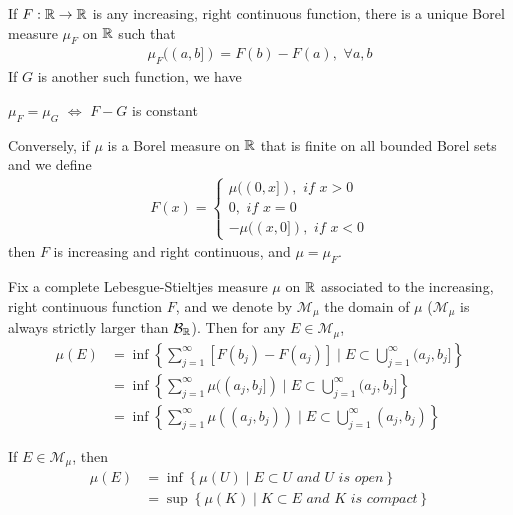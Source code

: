 	\begin{thm}\label{thm 2.5.1}
		If $F : \mathbb{R} \rightarrow \mathbb{R}$ is any increasing, right continuous function, there is a unique Borel measure $\mu_F$ on $\mathbb{R}$ such that 
		\begin{align}
			\mu_F((a , b]) = F(b) - F(a) , \,\, \forall a , b
		\end{align}
		If $G$ is another such function, we have
		\begin{center}
			$\mu_F = \mu_G \,\, \Leftrightarrow \,\, F - G$ is constant
		\end{center}
		Conversely, if $\mu$ is a Borel measure on $\mathbb{R}$ that is finite on all bounded Borel sets and we define
		\begin{align}
			F(x) = 
			\begin{cases}
				\mu((0 , x]) , \,\, if \,\, x > 0 \\
				0 , \,\, if \,\, x = 0 \\
				-\mu((x , 0]) , \,\, if \,\, x < 0
			\end{cases}
		\end{align}
		then $F$ is increasing and right continuous, and $\mu = \mu_F$.
	\end{thm}

	\newpage
	
	\begin{lemma}\label{lemma 2.5.2}
		Fix a complete Lebesgue-Stieltjes measure $\mu$ on $\mathbb{R}$ associated to the increasing, right continuous function $F$, and we denote by $\mathcal{M}_\mu$ the domain of $\mu$ ($\mathcal{M}_\mu$ is always strictly larger than $\mathcal{B}_{\mathbb{R}}$). Then for any $E \in \mathcal{M}_\mu$,
		\begin{align}
			\mu(E) 
			&= \inf{\left\{ \sum_{j = 1}^{\infty}{\left[ F(b_j) - F(a_j) \right]} \mid E \subset \bigcup_{j = 1}^{\infty}{(a_j , b_j]} \right\}} \\
			&= \inf{\left\{ \sum_{j = 1}^{\infty}{\mu((a_j , b_j])} \mid E \subset \bigcup_{j = 1}^{\infty}{(a_j , b_j]} \right\}} \\
			&= \inf{\left\{ \sum_{j = 1}^{\infty}{\mu((a_j , b_j))} \mid E \subset \bigcup_{j = 1}^{\infty}{(a_j , b_j)} \right\}}
		\end{align}
	\end{lemma}
	
	\vspace*{6em}
	
	\begin{thm}\label{thm 2.5.3}
		If $E \in \mathcal{M}_\mu$, then
		\begin{align}
			\mu(E) 
			&= \inf{\left\{ \mu(U) \mid E \subset U \,\, and \,\, U \,\, is \,\, open \right\}} \\
			&= \sup{\left\{ \mu(K) \mid K \subset E \,\, and \,\, K \,\, is \,\, compact \right\}}
		\end{align}
	\end{thm}
	
